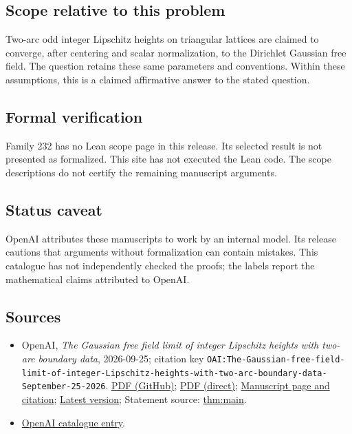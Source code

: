 \documentclass[11pt]{article}
\begin{document}
\subsection{Scope relative to this problem}
Two-arc odd integer Lipschitz heights on triangular lattices are claimed to converge, after centering and scalar normalization, to the Dirichlet Gaussian free field. The question retains these same parameters and conventions. Within these assumptions, this is a claimed affirmative answer to the stated question.

\subsection{Formal verification}
Family 232 has no Lean scope page in this release. Its selected result is not presented as formalized. This site has not executed the Lean code. The scope descriptions do not certify the remaining manuscript arguments.

\subsection{Status caveat}
OpenAI attributes these manuscripts to work by an internal model. Its release cautions that arguments without formalization can contain mistakes. This catalogue has not independently checked the proofs; the labels report the mathematical claims attributed to OpenAI.

\subsection{Sources}
\begin{itemize}
\item OpenAI, \emph{The Gaussian free field limit of integer Lipschitz heights with two-arc boundary data}, 2026-09-25; citation key \texttt{OAI:The-Gaussian-free-field-limit-of-integer-Lipschitz-heights-with-two-arc-boundary-data-September-25-2026}. \href{https://github.com/openai/math/blob/adc7f1241b42e322a6451854ab7e4b4c146bf78a/preprints/The-Gaussian-free-field-limit-of-integer-Lipschitz-heights-with-two-arc-boundary-data-September-25-2026/paper.pdf}{PDF (GitHub)}; \href{https://github.com/openai/math/raw/adc7f1241b42e322a6451854ab7e4b4c146bf78a/preprints/The-Gaussian-free-field-limit-of-integer-Lipschitz-heights-with-two-arc-boundary-data-September-25-2026/paper.pdf}{PDF (direct)}; \href{https://github.com/openai/math/blob/adc7f1241b42e322a6451854ab7e4b4c146bf78a/preprints/The-Gaussian-free-field-limit-of-integer-Lipschitz-heights-with-two-arc-boundary-data-September-25-2026/README.md}{Manuscript page and citation}; \href{https://github.com/openai/math/blob/main/preprints/The-Gaussian-free-field-limit-of-integer-Lipschitz-heights-with-two-arc-boundary-data-September-25-2026/paper.pdf}{Latest version}; Statement source: \href{https://github.com/openai/math/blob/adc7f1241b42e322a6451854ab7e4b4c146bf78a/preprints/The-Gaussian-free-field-limit-of-integer-Lipschitz-heights-with-two-arc-boundary-data-September-25-2026/build/sections/01-introduction.tex\#L47}{thm:main}.
\item \href{https://github.com/openai/math/blob/adc7f1241b42e322a6451854ab7e4b4c146bf78a/CONTENTS.md}{OpenAI catalogue entry}.
\end{itemize}
\end{document}
